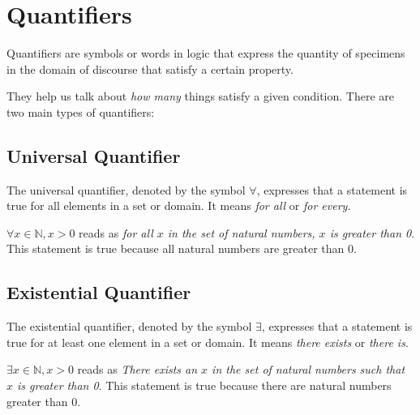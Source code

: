 \documentclass{article}
\theoremstyle{mytheoremstyle}
\theoremstyle{mytheoremstyle}
\theoremstyle{myexamplestyle}
\begin{document}
\newpage

\section{Quantifiers}

\begin{definition}
    Quantifiers are symbols or words in logic that express the
    quantity of specimens in the domain of discourse that satisfy a
    certain property.
\end{definition}

They help us talk about \emph{how many} things satisfy a given
condition. There are two main types of quantifiers:

\subsection{Universal Quantifier}

\begin{definition}
    The universal quantifier, denoted by the symbol $\forall$,
    expresses that a statement is true for all elements in a set or
    domain. It means \emph{for all} or \emph{for every}.
\end{definition}


\begin{example}
    $\forall x \in \mathbb{N}, x > 0$ reads as \emph{for all $x$ in
        the set of natural numbers, $x$ is greater than 0}. This
    statement is true because all natural numbers are greater than 0.
\end{example}

\subsection{Existential Quantifier}
\begin{definition}
    The existential quantifier, denoted by the symbol $\exists$,
    expresses that a statement is true for at least one element in a
    set or domain. It means \emph{there exists} or \emph{there is}.
\end{definition}


\begin{example}
    $\exists x \in \mathbb{N}, x > 0$ reads as \emph{There
        exists an $x$ in the set of natural numbers such that $x$ is greater
        than 0}. This statement is true because there are natural
    numbers greater than 0.
\end{example}
\end{document}
